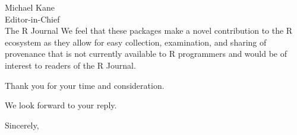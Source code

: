 \documentclass[10pt]{letter} %
\begin{document}
\begin{letter}{Michael Kane \\ Editor-in-Chief \\ The R Journal}
We feel that these packages make a novel contribution to the R ecosystem as they allow for easy collection, examination, and sharing of provenance that is not currently available to R programmers and would be of interest to readers of the R Journal.

Thank you for your time and consideration.

We look forward to your reply.

\vspace{2\parskip} %
\closing{Sincerely,}
\vspace{2\parskip} %




\end{letter}
 
\end{document}

